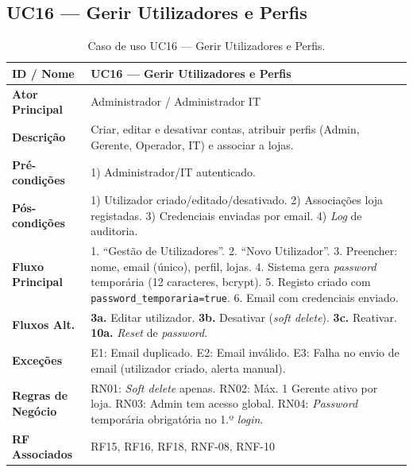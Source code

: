 \documentclass[a4paper,12pt]{scrreprt}
\begin{document}
\subsection*{UC16 --- Gerir Utilizadores e Perfis}
\begin{table}[H]
\centering\small
\begin{tabular}{|p{3cm}|p{11cm}|}
\hline
\textbf{ID / Nome} & UC16 --- Gerir Utilizadores e Perfis \\
\hline
\textbf{Ator Principal} & Administrador / Administrador IT \\
\hline
\textbf{Descrição} & Criar, editar e desativar contas, atribuir perfis (Admin, Gerente, Operador, IT) e associar a lojas. \\
\hline
\textbf{Pré-condições} & 1) Administrador/IT autenticado. \\
\hline
\textbf{Pós-condições} & 1) Utilizador criado/editado/desativado. 2) Associações loja registadas. 3) Credenciais enviadas por email. 4) \textit{Log} de auditoria. \\
\hline
\textbf{Fluxo Principal} & 1. ``Gestão de Utilizadores''. 2. ``Novo Utilizador''. 3. Preencher: nome, email (único), perfil, lojas. 4. Sistema gera \textit{password} temporária (12 caracteres, bcrypt). 5. Registo criado com \texttt{password\_temporaria=true}. 6. Email com credenciais enviado. \\
\hline
\textbf{Fluxos Alt.} & \textbf{3a.} Editar utilizador. \textbf{3b.} Desativar (\textit{soft delete}). \textbf{3c.} Reativar. \textbf{10a.} \textit{Reset} de \textit{password}. \\
\hline
\textbf{Exceções} & E1: Email duplicado. E2: Email inválido. E3: Falha no envio de email (utilizador criado, alerta manual). \\
\hline
\textbf{Regras de Negócio} & RN01: \textit{Soft delete} apenas. RN02: Máx. 1 Gerente ativo por loja. RN03: Admin tem acesso global. RN04: \textit{Password} temporária obrigatória no 1.º \textit{login}. \\
\hline
\textbf{RF Associados} & RF15, RF16, RF18, RNF-08, RNF-10 \\
\hline
\end{tabular}
\caption{Caso de uso UC16 --- Gerir Utilizadores e Perfis.}
\end{table}

\end{document}
